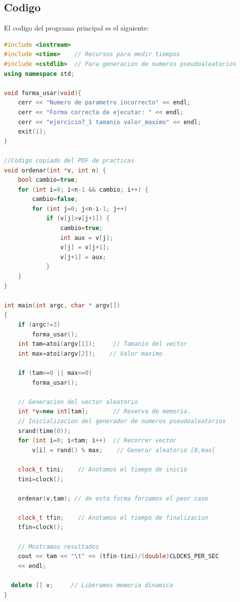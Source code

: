 \documentclass[12pt,a4psprt]{article}
\begin{document}
\subsection{Codigo}
El codigo del programa principal es el siguiente:
\begin{lstlisting}[language=C++]
#include <iostream>
#include <ctime>    // Recursos para medir tiempos
#include <cstdlib>  // Para generacion de numeros pseudoaleatorios
using namespace std;

void forma_usar(void){
	cerr << "Numero de parametro incorrecto" << endl;
	cerr << "Forma correcta de ejecutar: " << endl;
	cerr << "ejercicio7_1 tamanio valor_maximo" << endl;
	exit(1);
}

//Codigo copiado del PDF de practicas
void ordenar(int *v, int n) {
	bool cambio=true;
	for (int i=0; i<n-1 && cambio; i++) {
		cambio=false;
		for (int j=0; j<n-i-1; j++)
			if (v[j]>v[j+1]) {
				cambio=true;
				int aux = v[j];
				v[j] = v[j+1];
				v[j+1] = aux;
			}
	}
}

int main(int argc, char * argv[])
{
	if (argc!=3)
		forma_usar();
	int tam=atoi(argv[1]);     // Tamanio del vector
	int max=atoi(argv[2]);    // Valor maximo
	
	if (tam<=0 || max<=0)
    	forma_usar();
  
	// Generacion del vector aleatorio
	int *v=new int[tam];       // Reserva de memoria.
	// Inicializacion del generador de numeros pseudoaleatorios
	srand(time(0));            
	for (int i=0; i<tam; i++)  // Recorrer vector
		v[i] = rand() % max;    // Generar aleatorio [0,max[

	clock_t tini;    // Anotamos el tiempo de inicio
	tini=clock();

	ordenar(v,tam); // de esta forma forzamos el peor caso
  
	clock_t tfin;    // Anotamos el tiempo de finalizaciun
	tfin=clock();

	// Mostramos resultados
	cout << tam << "\t" << (tfin-tini)/(double)CLOCKS_PER_SEC 
	<< endl;
  
  delete [] v;     // Liberamos memoria dinamica
}

\end{lstlisting}
\end{document}
